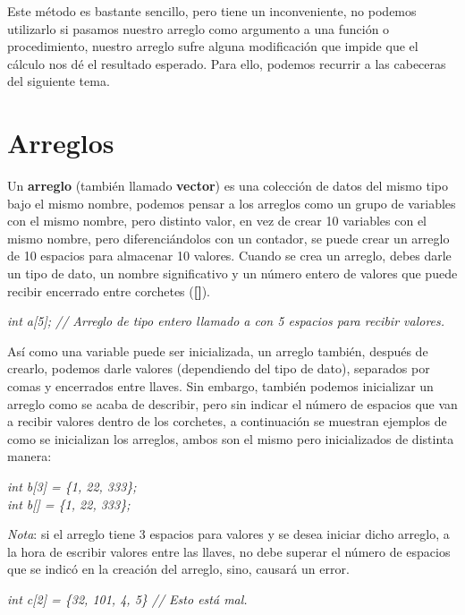 Este método es bastante sencillo, pero tiene un inconveniente, no podemos utilizarlo si pasamos nuestro arreglo como argumento a una función o procedimiento, nuestro arreglo sufre alguna modificación que impide que el cálculo nos dé el resultado esperado. Para ello, podemos recurrir a las cabeceras del siguiente tema.



\section{Arreglos}
\hspace{0.55cm}Un \textbf{arreglo} (también llamado \textbf{vector}) es una colección de datos del mismo tipo bajo el mismo nombre, podemos pensar a los arreglos como un grupo de variables con el mismo nombre, pero distinto valor, en vez de crear 10 variables con el mismo nombre, pero diferenciándolos con un contador, se puede crear un arreglo de 10 espacios para almacenar 10 valores. Cuando se crea un arreglo, debes darle un tipo de dato, un nombre significativo y un número entero de valores que puede recibir encerrado entre corchetes (\textbf{[]}).
\begin{center}
	\textit{int a[5]; // Arreglo de tipo entero llamado a con 5 espacios para recibir valores.}
\end{center}

Así como una variable puede ser inicializada, un arreglo también, después de crearlo, podemos darle valores (dependiendo del tipo de dato), separados por comas y encerrados entre llaves. Sin embargo, también podemos inicializar un arreglo como se acaba de describir, pero sin indicar el número de espacios que van a recibir valores dentro de los corchetes, a continuación se muestran ejemplos de como se inicializan los arreglos, ambos son el mismo pero inicializados de distinta manera:
\begin{center}
    \textit{
		int b[3] = \{1, 22, 333\}; \\
		int b[] = \{1, 22, 333\};
	}
\end{center}

\textit{Nota}: si el arreglo tiene 3 espacios para valores y se desea iniciar dicho arreglo, a la hora de escribir valores entre las llaves, no debe superar el número de espacios que se indicó en la creación del arreglo, sino, causará un error.
\begin{center}
	\textit{int c[2] = \{32, 101, 4, 5\} // Esto está mal.}
\end{center}

